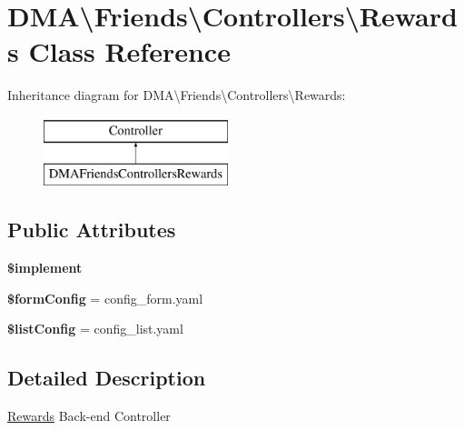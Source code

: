 \hypertarget{classDMA_1_1Friends_1_1Controllers_1_1Rewards}{}\section{D\+M\+A\textbackslash{}Friends\textbackslash{}Controllers\textbackslash{}Rewards Class Reference}
\label{classDMA_1_1Friends_1_1Controllers_1_1Rewards}
Inheritance diagram for D\+M\+A\textbackslash{}Friends\textbackslash{}Controllers\textbackslash{}Rewards\+:\begin{figure}[H]
\begin{center}
\leavevmode
\includegraphics[height=2.000000cm]{d2/dab/classDMA_1_1Friends_1_1Controllers_1_1Rewards}
\end{center}
\end{figure}
\subsection*{Public Attributes}
\begin{DoxyCompactItemize}
\item 
{\bfseries \$implement}
\item 
\hypertarget{classDMA_1_1Friends_1_1Controllers_1_1Rewards_a9522421e338fbc2e218588583b5fb9a7}{}{\bfseries \$form\+Config} = \textquotesingle{}config\+\_\+form.\+yaml\textquotesingle{}\label{classDMA_1_1Friends_1_1Controllers_1_1Rewards_a9522421e338fbc2e218588583b5fb9a7}

\item 
\hypertarget{classDMA_1_1Friends_1_1Controllers_1_1Rewards_a887be4eff98a60ac76c7c06e4513430a}{}{\bfseries \$list\+Config} = \textquotesingle{}config\+\_\+list.\+yaml\textquotesingle{}\label{classDMA_1_1Friends_1_1Controllers_1_1Rewards_a887be4eff98a60ac76c7c06e4513430a}

\end{DoxyCompactItemize}


\subsection{Detailed Description}
\hyperlink{classDMA_1_1Friends_1_1Controllers_1_1Rewards}{Rewards} Back-\/end Controller 

